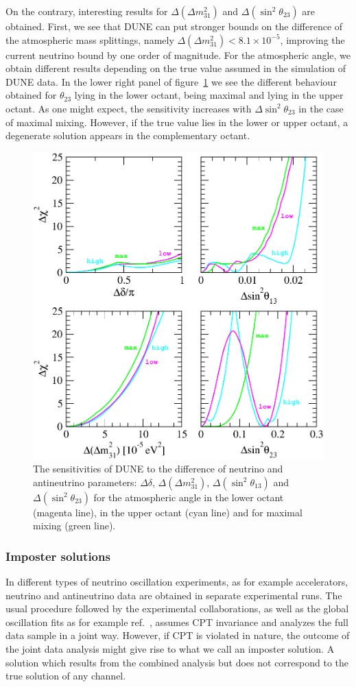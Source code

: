 On the contrary, interesting results for $\Delta(\Delta m_{31}^2)$ and $\Delta(\sin^2\theta_{23})$ are obtained. First, we see that  DUNE can put stronger bounds on the difference of the atmospheric mass splittings, namely $\Delta(\Delta m_{31}^2) < 8.1\times 10^{-5}$, improving the current neutrino bound by one order of magnitude. For the atmospheric angle, we obtain different results depending on the true value assumed in the simulation of DUNE data. In the lower right panel of figure~\ref{fig:sensitivity-CPT} we see the different behaviour obtained for $\theta_{23}$ lying in the lower octant, being maximal and lying in the upper octant. As one might expect, the sensitivity increases with $\Delta\sin^2\theta_{23}$ in the case of maximal mixing. However, if the true value lies in the lower or upper octant, a degenerate solution appears in the complementary octant.
\begin{figure}[!htb]
 \centering
        \includegraphics[width=0.55\columnwidth]{graphics/sensitivity-CPT.pdf}
        \caption{The sensitivities of DUNE to the difference of neutrino and antineutrino parameters: 
        $\Delta\delta$, $\Delta(\Delta m_{31}^2)$, $\Delta(\sin^2\theta_{13})$ and $\Delta(\sin^2\theta_{23})$  
        for the atmospheric angle in the lower octant (magenta line),  in the upper octant (cyan line) and for maximal mixing (green line).}
	\label{fig:sensitivity-CPT}
\end{figure}

\subsubsection{Imposter solutions}
\label{sec:impost}
In different types of neutrino oscillation experiments, as for example accelerators, neutrino and antineutrino data are obtained in separate experimental runs. The usual procedure followed by the experimental collaborations, as well as the global oscillation fits as for example ref.~\cite{deSalas:2017kay}, assumes CPT invariance and analyzes the full data sample in a joint way. 
%
However, if CPT is violated in nature, the outcome of the joint data analysis might give rise to what we call an imposter solution. A solution which results from the combined analysis but does not correspond to the true solution of any channel. 

